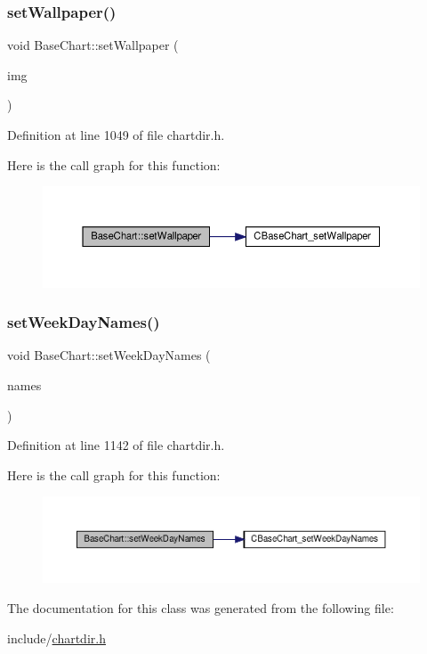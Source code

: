 \subsubsection{\texorpdfstring{set\+Wallpaper()}{setWallpaper()}}
{\footnotesize\ttfamily void Base\+Chart\+::set\+Wallpaper (\begin{DoxyParamCaption}\item[{const char $\ast$}]{img }\end{DoxyParamCaption})\hspace{0.3cm}{\ttfamily [inline]}}



Definition at line 1049 of file chartdir.\+h.

Here is the call graph for this function\+:
\nopagebreak
\begin{figure}[H]
\begin{center}
\leavevmode
\includegraphics[width=350pt]{class_base_chart_a736e897f2b7239817d17afa5ae48103a_cgraph}
\end{center}
\end{figure}
\mbox{\label{class_base_chart_ae5e356fe9bf0920d82b58e077eb317c5}} 
\subsubsection{\texorpdfstring{set\+Week\+Day\+Names()}{setWeekDayNames()}}
{\footnotesize\ttfamily void Base\+Chart\+::set\+Week\+Day\+Names (\begin{DoxyParamCaption}\item[{\hyperlink{class_string_array}{String\+Array}}]{names }\end{DoxyParamCaption})\hspace{0.3cm}{\ttfamily [inline]}}



Definition at line 1142 of file chartdir.\+h.

Here is the call graph for this function\+:
\nopagebreak
\begin{figure}[H]
\begin{center}
\leavevmode
\includegraphics[width=350pt]{class_base_chart_ae5e356fe9bf0920d82b58e077eb317c5_cgraph}
\end{center}
\end{figure}


The documentation for this class was generated from the following file\+:\begin{DoxyCompactItemize}
\item 
include/\hyperlink{chartdir_8h}{chartdir.\+h}\end{DoxyCompactItemize}
